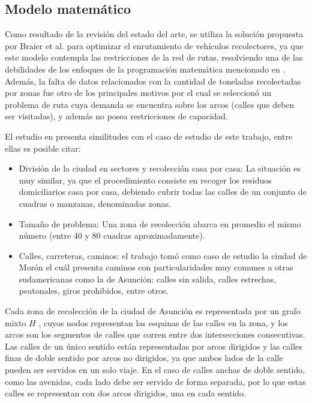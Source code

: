 \documentclass[spanish, conference]{IEEEtran}
\begin{document}
\subsection{Modelo matemático}

Como resultado de la revisión del estado del arte, se utiliza la solución propuesta por Braier et al. \cite{Braier2017AnArgentina} para optimizar el enrutamiento de vehículos recolectores, ya que este modelo contempla las restricciones de la red de rutas, resolviendo una de las debilidades de los enfoques de la programación matemática mencionado en \cite{Sulemana2018OptimalMethods}. Además, la falta de datos relacionados con la cantidad de toneladas recolectadas por zonas fue otro de los principales motivos por el cual se seleccionó un problema de ruta cuya demanda se encuentra sobre los arcos (calles que deben ser visitadas), y además no posea restricciones de capacidad.

El estudio en \cite{Braier2017AnArgentina} presenta similitudes con el caso de estudio de este trabajo, entre ellas es posible citar:

\begin{itemize}
    \item División de la ciudad en sectores y recolección casa por casa: La situación es muy similar, ya que el procedimiento consiste en recoger los residuos domiciliarios casa por casa, debiendo cubrir todas las calles de un conjunto de cuadras o manzanas, denominadas zonas.
    \item Tamaño de problema: Una zona de recolección abarca en promedio el mismo número (entre 40 y 80 cuadras aproximadamente).
    \item Calles, carreteras, caminos: el trabajo \cite{Braier2017AnArgentina} tomó como caso de estudio la ciudad de Morón el cuál presenta caminos con particularidades muy comunes a otras sudamericanas como la de Asunción: calles sin salida, calles estrechas, peatonales, giros prohibidos, entre otros.
\end{itemize}

Cada zona de recolección de la ciudad de Asunción es representada por un grafo mixto $H$ \cite{Braier2017AnArgentina}, cuyos nodos representan las esquinas de las calles en la zona, y los arcos son los segmentos de calles que corren entre dos intersecciones consecutivas. Las calles de un único sentido están representadas por arcos dirigidos y las calles finas de doble sentido por arcos no dirigidos, ya que ambos lados de la calle pueden ser servidos en un solo viaje. En el caso de calles anchas de doble sentido, como las avenidas, cada lado debe ser servido de forma separada, por lo que estas calles se representan con dos arcos dirigidos, una en cada sentido.
\end{document}
